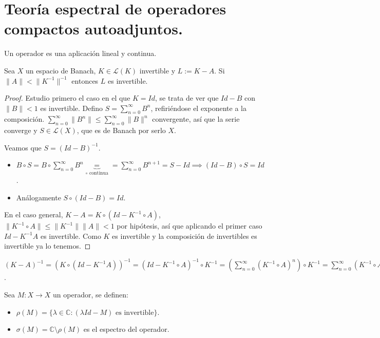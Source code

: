 \section{Teoría espectral de operadores compactos autoadjuntos.}

\begin{definition}
  Un operador es una aplicación lineal y continua.
\end{definition}

\begin{theorem}
  \label{th:Von-Neumann}
  Sea $X$ un espacio de Banach, $K\in \mathcal{L}(K)$ invertible y $L:=K-A$. Si
  $\|A\|<\|K^{-1}\|^{-1}$ entonces $L$ es invertible.
\end{theorem}

\begin{proof}
  Estudio primero el caso en el que $K=Id$, se trata de ver que  $Id-B$ con
  $\|B\|<1$ es invertible. Defino $S=\sum_{n=0}^{\infty} B^n$, refiriéndose el
  exponente a la composición. $\sum_{n=0}^{\infty} \|B^n\|\le
  \sum_{n=0}^{\infty} \|B\|^n$ convergente, así que la serie converge y $S\in
  \mathcal{L}(X)$, que es de Banach por serlo $X$.

  Veamos que $S=(Id-B)^{-1}$.

  \begin{itemize}
    \item $B\circ S=B\circ \sum_{n=0}^{\infty} B^n
      \underbrace{=}_{\circ \text{ continua}}=\sum_{n=0}^{\infty}
      B^{n+1}=S-Id\implies(Id-B)\circ S=Id$.
    \item Análogamente $S\circ (Id-B)=Id$.
  \end{itemize}

  En el caso general, $K-A=K\circ (Id-K^{-1}\circ A)$, $\|K^{-1}\circ A\|\le
  \|K^{-1}\|\|A\|<1$ por hipótesis, así que aplicando el primer caso
  $Id-K^{-1}A$ es invertible. Como $K$ es invertible y la composición de
  invertibles es invertible ya lo tenemos.
\end{proof}

\begin{remark}
  \label{rem:inverse-formula}
  $(K-A)^{-1}=(K\circ (Id-K^{-1}A))^{-1}=(Id-K^{-1}\circ A)^{-1}\circ
  K^{-1}=\left( \sum_{n=0}^{\infty} (K^{-1}\circ A)^n \right) \circ
  K^{-1}=\sum_{n=0}^{\infty} (K^{-1}\circ A)^n K^{-1}$.
\end{remark}

\begin{definition}
  Sea $M:X\to X$ un operador, se definen:
  \begin{itemize}
    \item $\rho(M)=\{\lambda\in \mathbb{C}:(\lambda Id-M) \text{ es
      invertible}\} $.
    \item $\sigma(M)=\mathbb{C}\setminus \rho(M)$ es el espectro del operador.
  \end{itemize}
\end{definition}

